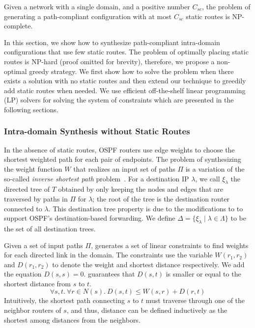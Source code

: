 \iffull
\begin{theorem}
\label{thm:ospfsynth}
Given a
network with a single domain,
and a positive number $C_{sc}$,
the problem of generating
a path-compliant configuration with at most $C_{sc}$ static routes
is NP-complete.
\end{theorem}

\fi

In this section, we show how to synthesize 
path-compliant  intra-domain configurations that
use few static routes.
The problem of optimally placing 
static routes is NP-hard (proof omitted for brevity), 
therefore, we propose a non-optimal greedy strategy.
We first show how to solve the problem when 
there exists a solution with no static routes
and then extend our technique to greedily 
add static routes when needed. We use 
efficient off-the-shelf linear programming (LP) 
solvers for solving the system of constraints 
which are presented in the following sections. 
	

\subsubsection{Intra-domain Synthesis without Static Routes} \label{sec:ospf}
 
In the absence of static routes,
OSPF routers use edge weights to choose the
shortest weighted path for each pair of endpoints. 
The problem of synthesizing the weight function $W$ that
realizes an input set of paths $\Pi$ is a
variation of the so-called {\em inverse shortest path} 
problem~\cite{isp}. 
For a destination IP $\lambda$, we call $\xi_\lambda$ 
the directed tree of $T$ 
obtained by only keeping the nodes and edges 
that are traversed by paths in $\Pi$ for 
$\lambda$; the root of the tree
is the destination router connected to $\lambda$. 
 This destination tree
 property is due to the modifications to \genesis
 to support OSPF's destination-based forwarding. We
 define $\Delta=\{\xi_\lambda\mid \lambda \in \Lambda\}$ to be 
the set of all destination trees. 

Given a set of input paths $\Pi$, \name 
generates a set of linear constraints to 
find weights 
for each directed link in the domain.
The constraints use the variable $W(r_1, r_2)$ and
$D(r_1, r_2)$ to denote the weight 
and shortest distance respectively. 
We add the equation $D(s, s) = 0$.  
 guarantees that $D(s,t)$ is smaller or equal to
the shortest distance from $s$ to $t$.
\begin{equation} \label{eq:distance}
\forall s, t. ~\forall r \in N(s).~
D(s,t) \leq W(s,r) + D(r,t)
\end{equation}
Intuitively, the shortest path connecting $s$ to $t$
must traverse through one of the neighbor routers of $s$,
and thus, distance can be defined inductively as the 
shortest among distances from the neighbors. 

